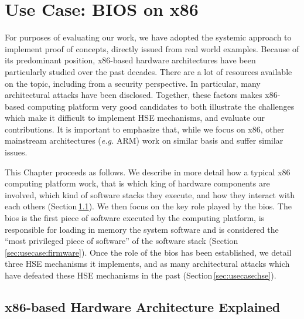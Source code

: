 \chapter{Use Case: BIOS on x86}
\label{chapter:usecase}


For purposes of evaluating our work, we have adopted the systemic approach to
implement proof of concepts, directly issued from real world examples.
%
Because of its predominant position, x86-based hardware architectures have been
particularly studied over the past decades.
%
There are a lot of resources available on the topic, including from a security
perspective.
%
In particular, many architectural attacks have been disclosed.
%
Together, these factors makes x86-based computing platform very good candidates
to both illustrate the challenges which make it difficult to implement HSE
mechanisms, and evaluate our contributions.
%
It is important to emphasize that, while we focus on x86, other mainstream
architectures (\emph{e.g.} ARM) work on similar basis and suffer similar issues.

This Chapter proceeds as follows.
%
We describe in more detail how a typical x86 computing platform work, that is
which king of hardware components are involved, which kind of software stacks
they execute, and how they interact with each others
(Section\,\ref{sec:usecase:architecture}).
%
We then focus on the key role played by the \ac{bios}.
%
The \ac{bios} is the first piece of software executed by the computing platform,
is responsible for loading in memory the system software and is considered the
``most privileged piece of software'' of the software stack
(Section\,\ref{sec:usecase:firmware}).
%
Once the role of the \ac{bios} has been established, we detail three HSE
mechanisms it implements, and as many architectural attacks which have defeated
these HSE mechanisms in the past (Section\,\ref{sec:usecase:hse}).

\section{x86-based Hardware Architecture Explained}
\label{sec:usecase:architecture}

